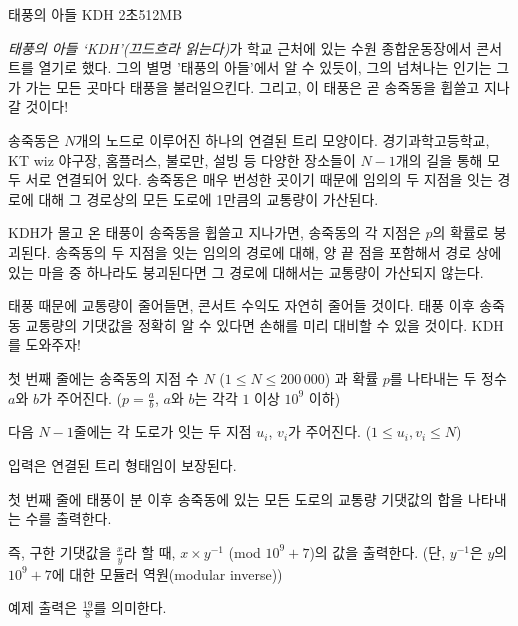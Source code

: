\begin{problem}{태풍의 아들 KDH}
{}{}
{2초}{512MB}{}

\textit{태풍의 아들 `KDH'(끄드흐라 읽는다)}가 학교 근처에 있는 수원 종합운동장에서 콘서트를 열기로 했다. 그의 별명 '태풍의 아들'에서 알 수 있듯이, 그의 넘쳐나는 인기는 그가 가는 모든 곳마다 태풍을 불러일으킨다. 그리고, 이 태풍은 곧 송죽동을 휩쓸고 지나갈 것이다!

송죽동은 $N$개의 노드로 이루어진 하나의 연결된 트리 모양이다. 경기과학고등학교, KT wiz 야구장, 홈플러스, 불로만, 설빙 등 다양한 장소들이 $N-1$개의 길을 통해 모두 서로 연결되어 있다. 송죽동은 매우 번성한 곳이기 때문에 임의의 두 지점을 잇는 경로에 대해 그 경로상의 모든 도로에 1만큼의 교통량이 가산된다.

KDH가 몰고 온 태풍이 송죽동을 휩쓸고 지나가면, 송죽동의 각 지점은 $p$의 확률로 붕괴된다. 송죽동의 두 지점을 잇는 임의의 경로에 대해, 양 끝 점을 포함해서 경로 상에 있는 마을 중 하나라도 붕괴된다면 그 경로에 대해서는 교통량이 가산되지 않는다. 

태풍 때문에 교통량이 줄어들면, 콘서트 수익도 자연히 줄어들 것이다. 태풍 이후 송죽동 교통량의 기댓값을 정확히 알 수 있다면 손해를 미리 대비할 수 있을 것이다. KDH를 도와주자!

\InputFile

첫 번째 줄에는 송죽동의 지점 수 $N$ ($1 \le N \le 200\, 000$) 과 확률 $p$를 나타내는 두 정수 $a$와 $b$가 주어진다. ($p= \frac{a}{b}$, $a$와 $b$는 각각 $1$ 이상 $10^9$ 이하)

다음 $N-1$줄에는 각 도로가 잇는 두 지점 $u_i$, $v_i$가 주어진다. ($1 \le u_i, v_i \le N$)

입력은 연결된 트리 형태임이 보장된다.

\OutputFile

첫 번째 줄에 태풍이 분 이후 송죽동에 있는 모든 도로의 교통량 기댓값의 합을 나타내는 수를 출력한다.

즉, 구한 기댓값을 $\frac{x}{y}$라 할 때, $x \times y^{-1}$ (mod $10^9+7$)의 값을 출력한다. (단, $y^{-1}$은 $y$의 $10^9+7$에 대한 모듈러 역원(modular inverse))

\Examples
	
\begin{example}
%
\end{example}

\Note

예제 출력은 $\frac{19}{8}$를 의미한다.

\blankpage

\end{problem}
